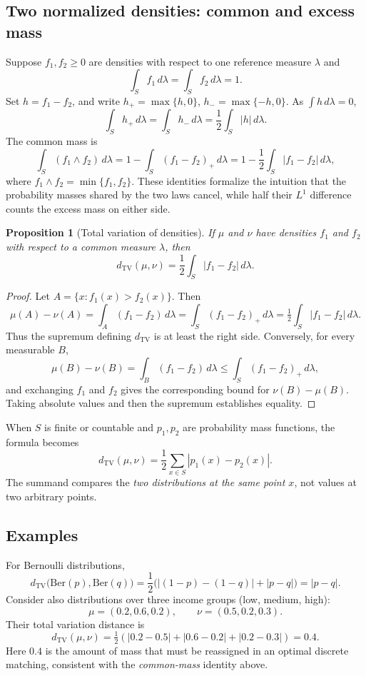 \documentclass[10pt,a4paper]{article}
\newtheorem{proposition}{Proposition}
\newcommand{\TV}{d_{\mathrm{TV}}}
\begin{document}
\subsection*{Two normalized densities: common and excess mass}
Suppose $f_1,f_2\ge0$ are densities with respect to one reference measure $\lambda$ and
\[
\int_S f_1\,d\lambda=\int_S f_2\,d\lambda=1.
\]
Set $h=f_1-f_2$, and write $h_+=\max\{h,0\}$, $h_-=\max\{-h,0\}$. As $\int h\,d\lambda=0$,
\begin{equation}\label{eq:mass}
\int_S h_+\,d\lambda=\int_S h_-\,d\lambda
=\frac12\int_S|h|\,d\lambda.
\end{equation}
The common mass is
\[
\int_S(f_1\wedge f_2)\,d\lambda
=1-\int_S(f_1-f_2)_+\,d\lambda
=1-\frac12\int_S|f_1-f_2|\,d\lambda,
\]
where $f_1\wedge f_2=\min\{f_1,f_2\}$. These identities formalize the intuition that the probability masses shared by the two laws cancel, while half their $L^1$ difference counts the excess mass on either side.

\begin{proposition}[Total variation of densities]
If $\mu$ and $\nu$ have densities $f_1$ and $f_2$ with respect to a common measure $\lambda$, then
\[
\TV(\mu,\nu)=\frac12\int_S|f_1-f_2|\,d\lambda.
\]
\end{proposition}
\begin{proof}
Let $A=\{x:f_1(x)>f_2(x)\}$. Then
\[
\mu(A)-\nu(A)=\int_A(f_1-f_2)\,d\lambda
=\int_S(f_1-f_2)_+\,d\lambda
=\tfrac12\int_S|f_1-f_2|\,d\lambda.
\]
Thus the supremum defining $\TV$ is at least the right side. Conversely, for every measurable $B$,
\[
\mu(B)-\nu(B)=\int_B(f_1-f_2)\,d\lambda
\le\int_S(f_1-f_2)_+\,d\lambda,
\]
and exchanging $f_1$ and $f_2$ gives the corresponding bound for $\nu(B)-\mu(B)$. Taking absolute values and then the supremum establishes equality.
\end{proof}
When $S$ is finite or countable and $p_1,p_2$ are probability mass functions, the formula becomes
\[
\TV(\mu,\nu)=\frac12\sum_{x\in S}|p_1(x)-p_2(x)|.
\]
The summand compares the \emph{two distributions at the same point $x$}, not values at two arbitrary points.

\subsection*{Examples}
For Bernoulli distributions,
\[
\TV\bigl(\mathrm{Ber}(p),\mathrm{Ber}(q)\bigr)
=\frac12\bigl(|(1-p)-(1-q)|+|p-q|\bigr)=|p-q|.
\]
Consider also distributions over three income groups (low, medium, high):
\[
\mu=(0.2,0.6,0.2),\qquad\nu=(0.5,0.2,0.3).
\]
Their total variation distance is
\[
\TV(\mu,\nu)=\tfrac12(|0.2-0.5|+|0.6-0.2|+|0.2-0.3|)=0.4.
\]
Here $0.4$ is the amount of mass that must be reassigned in an optimal discrete matching, consistent with the \emph{common-mass} identity above.
\end{document}
